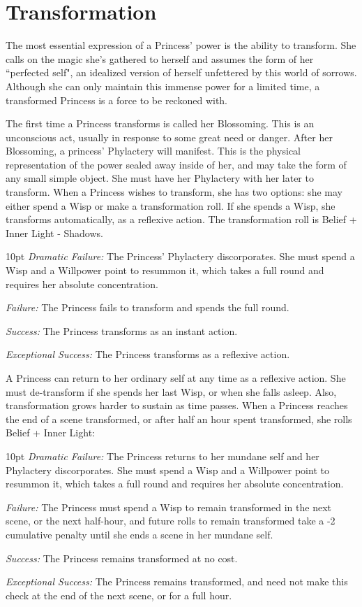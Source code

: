 \section*{Transformation}
The most essential expression of a Princess' power is the ability to transform. She calls on the magic she's gathered to herself and assumes the form of her \textquotedblleft perfected self", an idealized version of herself unfettered by this world of sorrows. Although she can only maintain this immense power for a limited time, a transformed Princess is a force to be reckoned with.

The first time a Princess transforms is called her Blossoming. This is an unconscious act, usually in response to some great need or danger. After her Blossoming, a princess' Phylactery will manifest. This is the physical representation of the power sealed away inside of her, and may take the form of any small simple object. She must have her Phylactery with her later to transform. When a Princess wishes to transform, she has two options: she may either spend a Wisp or make a transformation roll. If she spends a Wisp, she transforms automatically, as a reflexive action. The transformation roll is Belief + Inner Light - Shadows. 

\begin{myindentpar}{10pt}
    \emph{Dramatic Failure:} The Princess' Phylactery discorporates. She must spend a Wisp and a Willpower point to resummon it, which takes a full round and requires her absolute concentration. 
    
    \emph{Failure:} The Princess fails to transform and spends the full round. 
    
    \emph{Success:} The Princess transforms as an instant action. 
    
    \emph{Exceptional Success:} The Princess transforms as a reflexive action.
\end{myindentpar}

A Princess can return to her ordinary self at any time as a reflexive action. She must de-transform if she spends her last Wisp, or when she falls asleep. Also, transformation grows harder to sustain as time passes. When a Princess reaches the end of a scene transformed, or after half an hour spent transformed, she rolls Belief + Inner Light: 

\begin{myindentpar}{10pt}
    \emph{Dramatic Failure:} The Princess returns to her mundane self and her Phylactery discorporates. She must spend a Wisp and a Willpower point to resummon it, which takes a full round and requires her absolute concentration. 
    
    \emph{Failure:} The Princess must spend a Wisp to remain transformed in the next scene, or the next half-hour, and future rolls to remain transformed take a -2 cumulative penalty until she ends a scene in her mundane self. 
    
    \emph{Success:} The Princess remains transformed at no cost. 
    
    \emph{Exceptional Success:} The Princess remains transformed, and need not make this check at the end of the next scene, or for a full hour. 
\end{myindentpar}

